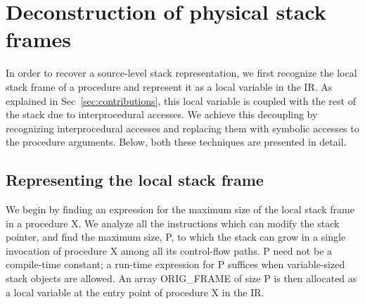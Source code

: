 \section{Deconstruction of physical stack frames} \label{sec:deconstructFrame}

In order to recover a source-level stack representation, we first recognize the local stack frame of a procedure and represent it as a local variable in the IR. As explained in Sec~\ref{sec:contributions}, this local variable is coupled with the rest of the stack due to interprocedural accesses. We achieve this decoupling by recognizing interprocedural accesses and replacing them with symbolic accesses to the procedure arguments. Below, both these techniques are presented in detail. 


\subsection{Representing the local stack frame} 

We begin by finding an expression for the maximum size of the local stack frame in a procedure X. We analyze all the instructions which can modify the stack pointer, and find the maximum size, P, to which the stack can grow in a single invocation of procedure X among all its control-flow paths. P need not be a compile-time constant; a run-time expression for P suffices when variable-sized stack objects are allowed. An array ORIG\_FRAME of size P is then allocated as a local variable at the entry point of procedure X in the IR.

